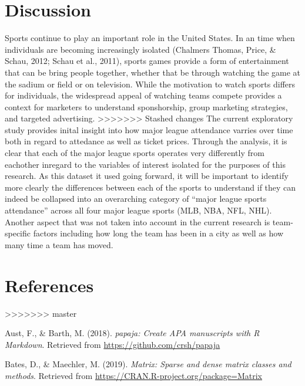 \documentclass[man, fleqn, noextraspace,floatsintext]{apa6}
\begin{document}
\hypertarget{discussion-1}{%
\section{Discussion}\label{discussion-1}}

Sports continue to play an important role in the United States. In an time when individuals are becoming increasingly isolated (Chalmers Thomas, Price, \& Schau, 2012; Schau et al., 2011), sports games provide a form of entertainment that can be bring people together, whether that be through watching the game at the sadium or field or on television. While the motivation to watch sports differs for individuals, the widespread appeal of watching teams compete provides a context for marketers to understand sponshorship, group marketing strategies, and targeted advertising.
\textgreater{}\textgreater{}\textgreater{}\textgreater{}\textgreater{}\textgreater{}\textgreater{} Stashed changes
The current exploratory study provides inital insight into how major league attendance varries over time both in regard to attedance as well as ticket prices. Through the analysis, it is clear that each of the major league sports operates very differently from eachother inregard to the variables of interest isolated for the purposes of this research.
As this dataset it used going forward, it will be important to identify more clearly the differences between each of the sports to understand if they can indeed be collapsed into an overarching category of \enquote{major league sports attendance} across all four major league sports (MLB, NBA, NFL, NHL). Another aspect that was not taken into account in the current research is team-specific factors including how long the team has been in a city as well as how many time a team has moved.

\newpage

\hypertarget{references}{%
\section{References}\label{references}}

>>>>>>> master
\begingroup
\setlength{\parindent}{-0.5in}
\setlength{\leftskip}{0.5in}

\hypertarget{refs}{}
\leavevmode\hypertarget{ref-R-papaja}{}%
Aust, F., \& Barth, M. (2018). \emph{papaja: Create APA manuscripts with R Markdown}. Retrieved from \url{https://github.com/crsh/papaja}

\leavevmode\hypertarget{ref-R-Matrix}{}%
Bates, D., \& Maechler, M. (2019). \emph{Matrix: Sparse and dense matrix classes and methods}. Retrieved from \url{https://CRAN.R-project.org/package=Matrix}
\end{document}
